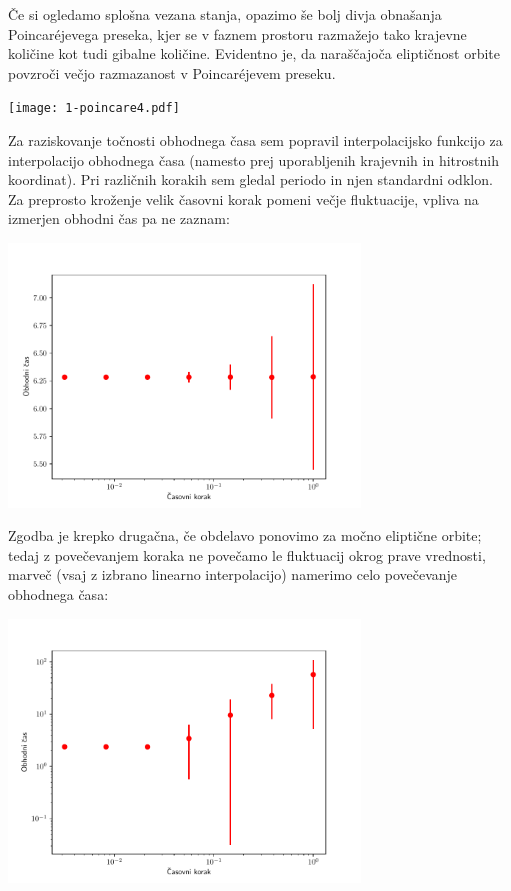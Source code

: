 Če si ogledamo splošna vezana stanja, opazimo še bolj divja obnašanja Poincaréjevega preseka, kjer se v faznem prostoru razmažejo tako krajevne količine kot tudi gibalne količine. Evidentno je, da naraščajoča eliptičnost orbite povzroči večjo razmazanost v Poincaréjevem preseku.
\begin{center}
     \texttt{[image: 1-poincare4.pdf]}
\end{center}


Za raziskovanje točnosti obhodnega časa sem popravil interpolacijsko funkcijo za interpolacijo obhodnega časa (namesto prej uporabljenih krajevnih in hitrostnih koordinat). Pri različnih korakih sem gledal periodo in njen standardni odklon. Za preprosto kroženje velik časovni korak pomeni večje fluktuacije, vpliva na izmerjen obhodni čas pa ne zaznam:
\begin{center}
     \includegraphics[width=0.7\textwidth]{1-periode.pdf}
\end{center}

Zgodba je krepko drugačna, če obdelavo ponovimo za močno eliptične orbite; tedaj z povečevanjem koraka ne povečamo le fluktuacij okrog prave vrednosti, marveč (vsaj z izbrano linearno interpolacijo) namerimo celo povečevanje obhodnega časa:
\begin{center}
     \includegraphics[width=0.7\textwidth]{1-periode_elipticno.pdf}
\end{center}

